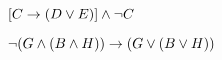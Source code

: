 \begin{practiceproblems}
\begin{earg}
	\item $[C \rightarrow (D \vee E)] \mathbin{\wedge} \neg C$
	
	
	\item $\neg(G \mathbin{\wedge} (B \mathbin{\wedge} H)) \rightarrow (G \vee (B \vee H))$
	
	

\end{earg}
\end{practiceproblems}
